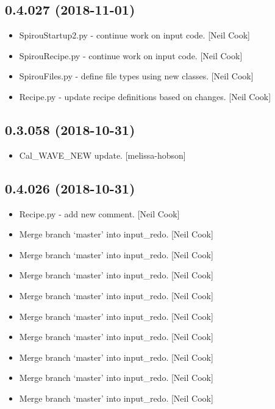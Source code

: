 \documentclass[a4paper,10pt,english]{report}
\begin{document}
\subsection{0.4.027 (2018-11-01)}
\label{\detokenize{misc/changelog:id272}}\begin{itemize}
\item {} 
SpirouStartup2.py - continue work on input code. {[}Neil Cook{]}

\item {} 
SpirouRecipe.py - continue work on input code. {[}Neil Cook{]}

\item {} 
SpirouFiles.py - define file types using new classes. {[}Neil Cook{]}

\item {} 
Recipe.py - update recipe definitions based on changes. {[}Neil Cook{]}

\end{itemize}


\subsection{0.3.058 (2018-10-31)}
\label{\detokenize{misc/changelog:id273}}\begin{itemize}
\item {} 
Cal\_WAVE\_NEW update. {[}melissa-hobson{]}

\end{itemize}


\subsection{0.4.026 (2018-10-31)}
\label{\detokenize{misc/changelog:id274}}\begin{itemize}
\item {} 
Recipe.py - add new comment. {[}Neil Cook{]}

\item {} 
Merge branch ‘master’ into input\_redo. {[}Neil Cook{]}

\item {} 
Merge branch ‘master’ into input\_redo. {[}Neil Cook{]}

\item {} 
Merge branch ‘master’ into input\_redo. {[}Neil Cook{]}

\item {} 
Merge branch ‘master’ into input\_redo. {[}Neil Cook{]}

\item {} 
Merge branch ‘master’ into input\_redo. {[}Neil Cook{]}

\item {} 
Merge branch ‘master’ into input\_redo. {[}Neil Cook{]}

\item {} 
Merge branch ‘master’ into input\_redo. {[}Neil Cook{]}

\item {} 
Merge branch ‘master’ into input\_redo. {[}Neil Cook{]}

\item {} 
Merge branch ‘master’ into input\_redo. {[}Neil Cook{]}

\end{itemize}
\end{document}
